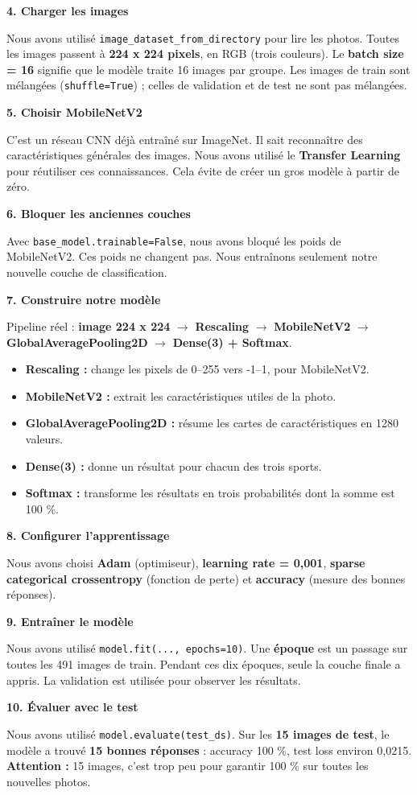 \documentclass[10pt,a4paper]{article}
\newcommand{\etape}[3]{\textbf{#1. #2}\par #3\par\vspace{3pt}}
\begin{document}
\etape{4}{Charger les images}{Nous avons utilisé \texttt{image\_dataset\_from\_directory} pour lire les photos. Toutes les images passent à \textbf{224 x 224 pixels}, en RGB (trois couleurs). Le \textbf{batch size = 16} signifie que le modèle traite 16 images par groupe. Les images de train sont mélangées (\texttt{shuffle=True}) ; celles de validation et de test ne sont pas mélangées.}
\etape{5}{Choisir MobileNetV2}{C'est un réseau CNN déjà entraîné sur ImageNet. Il sait reconnaître des caractéristiques générales des images. Nous avons utilisé le \textbf{Transfer Learning} pour réutiliser ces connaissances. Cela évite de créer un gros modèle à partir de zéro.}
\etape{6}{Bloquer les anciennes couches}{Avec \texttt{base\_model.trainable=False}, nous avons bloqué les poids de MobileNetV2. Ces poids ne changent pas. Nous entraînons seulement notre nouvelle couche de classification.}
\etape{7}{Construire notre modèle}{Pipeline réel : \textbf{image 224 x 224} $\to$ \textbf{Rescaling} $\to$ \textbf{MobileNetV2} $\to$ \textbf{GlobalAveragePooling2D} $\to$ \textbf{Dense(3) + Softmax}.}
\begin{itemize}
\item \textbf{Rescaling :} change les pixels de 0--255 vers -1--1, pour MobileNetV2.
\item \textbf{MobileNetV2 :} extrait les caractéristiques utiles de la photo.
\item \textbf{GlobalAveragePooling2D :} résume les cartes de caractéristiques en 1280 valeurs.
\item \textbf{Dense(3) :} donne un résultat pour chacun des trois sports.
\item \textbf{Softmax :} transforme les résultats en trois probabilités dont la somme est 100 \%.
\end{itemize}
\etape{8}{Configurer l'apprentissage}{Nous avons choisi \textbf{Adam} (optimiseur), \textbf{learning rate = 0,001}, \textbf{sparse categorical crossentropy} (fonction de perte) et \textbf{accuracy} (mesure des bonnes réponses).}
\etape{9}{Entraîner le modèle}{Nous avons utilisé \texttt{model.fit(..., epochs=10)}. Une \textbf{époque} est un passage sur toutes les 491 images de train. Pendant ces dix époques, seule la couche finale a appris. La validation est utilisée pour observer les résultats.}
\etape{10}{Évaluer avec le test}{Nous avons utilisé \texttt{model.evaluate(test\_ds)}. Sur les \textbf{15 images de test}, le modèle a trouvé \textbf{15 bonnes réponses} : accuracy 100 \%, test loss environ 0,0215. \textbf{Attention :} 15 images, c'est trop peu pour garantir 100 \% sur toutes les nouvelles photos.}
\end{document}
